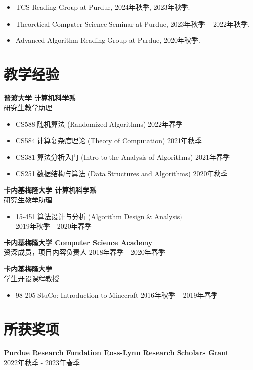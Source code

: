 \documentclass[margin, 10pt]{res} %
\begin{document}
\begin{resume}
\begin{itemize}
\item TCS Reading Group at Purdue, 2024年秋季, 2023年秋季.
\item Theoretical Computer Science Seminar at Purdue, 2023年秋季 -- 2022年秋季.
\item Advanced Algorithm Reading Group at Purdue, 2020年秋季.
\end{itemize}

\section{教学经验}

{\bf 普渡大学 计算机科学系}\\
研究生教学助理

\begin{itemize}
\item CS588 随机算法 (Randomized Algorithms) \hfill 2022年春季
\item CS584 计算复杂度理论 (Theory of Computation) \hfill 2021年秋季
\item CS381 算法分析入门 (Intro to the Analysis of Algorithms) \hfill 2021年春季
\item CS251 数据结构与算法 (Data Structures and Algorithms) \hfill 2020年秋季
\end{itemize}
{\bf 卡内基梅隆大学 计算机科学系}\\
研究生教学助理

\begin{itemize}
\item 15-451 算法设计与分析 (Algorithm Design \& Analysis) \\ \phantom{1}\hfill 2019年秋季 - 2020年春季
\end{itemize}

{\bf 卡内基梅隆大学 Computer Science Academy}\\
资深成员，项目内容负责人 \hfill 2018年春季 - 2020年春季

{\bf 卡内基梅隆大学}\\
学生开设课程教授

\begin{itemize}
\item 98-205 StuCo: Introduction to Minecraft \hfill 2016年秋季 -- 2019年春季
\end{itemize}

\section{所获奖项}
{\bf Purdue Research Fundation Ross-Lynn Research Scholars Grant} \\\hfill 2022年秋季 - 2023年春季


\end{resume}
\end{document}
